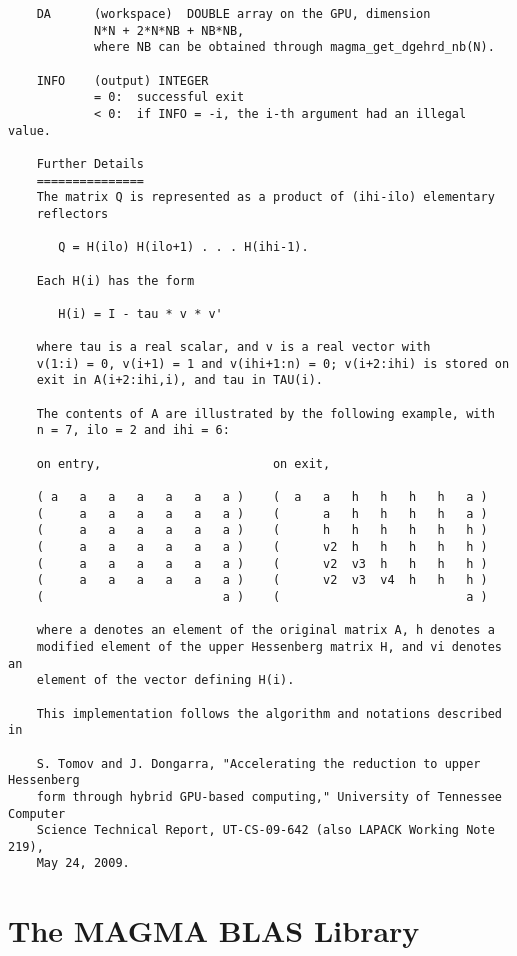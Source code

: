 \documentclass[10pt]{book}
\begin{document}
\begin{verbatim}
    DA      (workspace)  DOUBLE array on the GPU, dimension
            N*N + 2*N*NB + NB*NB,
            where NB can be obtained through magma_get_dgehrd_nb(N).

    INFO    (output) INTEGER
            = 0:  successful exit
            < 0:  if INFO = -i, the i-th argument had an illegal value.

    Further Details
    ===============
    The matrix Q is represented as a product of (ihi-ilo) elementary
    reflectors

       Q = H(ilo) H(ilo+1) . . . H(ihi-1).

    Each H(i) has the form

       H(i) = I - tau * v * v'

    where tau is a real scalar, and v is a real vector with
    v(1:i) = 0, v(i+1) = 1 and v(ihi+1:n) = 0; v(i+2:ihi) is stored on
    exit in A(i+2:ihi,i), and tau in TAU(i).

    The contents of A are illustrated by the following example, with
    n = 7, ilo = 2 and ihi = 6:

    on entry,                        on exit,

    ( a   a   a   a   a   a   a )    (  a   a   h   h   h   h   a )
    (     a   a   a   a   a   a )    (      a   h   h   h   h   a )
    (     a   a   a   a   a   a )    (      h   h   h   h   h   h )
    (     a   a   a   a   a   a )    (      v2  h   h   h   h   h )
    (     a   a   a   a   a   a )    (      v2  v3  h   h   h   h )
    (     a   a   a   a   a   a )    (      v2  v3  v4  h   h   h )
    (                         a )    (                          a )

    where a denotes an element of the original matrix A, h denotes a
    modified element of the upper Hessenberg matrix H, and vi denotes an
    element of the vector defining H(i).

    This implementation follows the algorithm and notations described in

    S. Tomov and J. Dongarra, "Accelerating the reduction to upper Hessenberg
    form through hybrid GPU-based computing," University of Tennessee Computer
    Science Technical Report, UT-CS-09-642 (also LAPACK Working Note 219),
    May 24, 2009.
\end{verbatim}


\normalsize
\chapter{The MAGMA BLAS Library}
\end{document}
